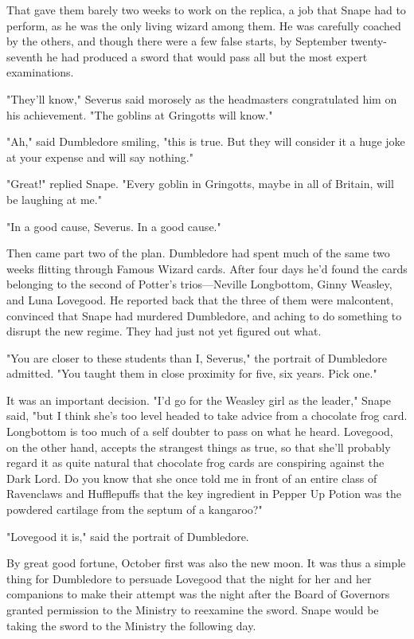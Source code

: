 That gave them barely two weeks to work on the replica, a job that Snape had to perform, as he was the only living wizard among them. He was carefully coached by the others, and though there were a few false starts, by September twenty-seventh he had produced a sword that would pass all but the most expert examinations.

"They'll know," Severus said morosely as the headmasters congratulated him on his achievement. "The goblins at Gringotts will know."

"Ah," said Dumbledore smiling, "this is true. But they will consider it a huge joke at your expense and will say nothing."

"Great!" replied Snape. "Every goblin in Gringotts, maybe in all of Britain, will be laughing at me."

"In a good cause, Severus. In a good cause."

Then came part two of the plan. Dumbledore had spent much of the same two weeks flitting through Famous Wizard cards. After four days he'd found the cards belonging to the second of Potter's trios—Neville Longbottom, Ginny Weasley, and Luna Lovegood. He reported back that the three of them were malcontent, convinced that Snape had murdered Dumbledore, and aching to do something to disrupt the new regime. They had just not yet figured out what.

"You are closer to these students than I, Severus," the portrait of Dumbledore admitted. "You taught them in close proximity for five, six years. Pick one."

It was an important decision. "I'd go for the Weasley girl as the leader," Snape said, "but I think she's too level headed to take advice from a chocolate frog card. Longbottom is too much of a self doubter to pass on what he heard. Lovegood, on the other hand, accepts the strangest things as true, so that she'll probably regard it as quite natural that chocolate frog cards are conspiring against the Dark Lord. Do you know that she once told me in front of an entire class of Ravenclaws and Hufflepuffs that the key ingredient in Pepper Up Potion was the powdered cartilage from the septum of a kangaroo?"

"Lovegood it is," said the portrait of Dumbledore.

By great good fortune, October first was also the new moon. It was thus a simple thing for Dumbledore to persuade Lovegood that the night for her and her companions to make their attempt was the night after the Board of Governors granted permission to the Ministry to reexamine the sword. Snape would be taking the sword to the Ministry the following day.

